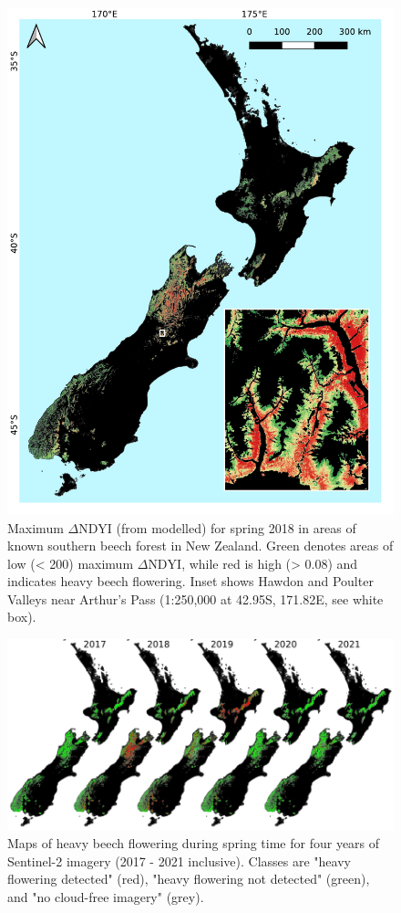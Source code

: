 \documentclass[remotesensing,article,submit,moreauthors,pdftex]{Definitions/mdpi}
\begin{document}
\begin{figure}
    \centering
    \includegraphics[width=\textwidth]{images/figure2_2018_dndyi.pdf}
    \caption{Maximum $\Delta\text{NDYI}$ (from modelled) for spring 2018 in areas of known southern beech
    forest in New Zealand. Green denotes areas of low (< 200) maximum $\Delta\text{NDYI}$, while red is high (> 0.08) and indicates heavy beech flowering. Inset shows Hawdon and Poulter Valleys near Arthur's Pass (1:250,000 at 42.95\degree{}S, 171.82\degree{}E, see white box).}
    \label{fig:ndyinz}
\end{figure}  

\begin{figure}
    \centering
    \includegraphics[width=\textwidth]{images/figure3_timeseries.pdf}
    \caption{Maps of heavy beech flowering during spring time for four years of Sentinel-2 imagery (2017 - 2021 inclusive). Classes are "heavy flowering detected" (red), "heavy flowering not detected" (green), and "no cloud-free imagery" (grey).}
    \label{fig:mapts}
\end{figure}  
\end{document}
